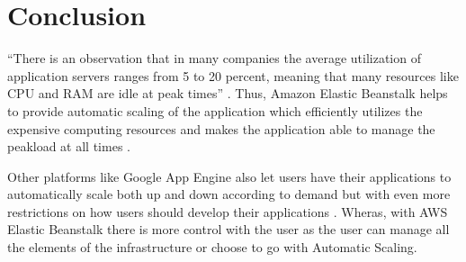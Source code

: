 \documentclass[9pt,twocolumn,twoside]{../../styles/osajnl}
\begin{document}
\section{Conclusion}

``There is an observation that in many companies the average
utilization of application servers ranges from 5 to 20 percent,
meaning that many resources like CPU and RAM are idle at peak times''
\cite{cloudcomputing-2}. Thus, Amazon Elastic Beanstalk helps to
provide automatic scaling of the application which efficiently
utilizes the expensive computing resources and makes the application
able to manage the peakload at all times \cite{elastic-faq}.

Other platforms like Google App Engine also let users have their
applications to automatically scale both up and down according to
demand but with even more restrictions on how users should develop
their applications \cite{google-appengine}. Wheras, with AWS Elastic
Beanstalk there is more control with the user as the user can manage
all the elements of the infrastructure or choose to go with Automatic
Scaling.



 
\end{document}
